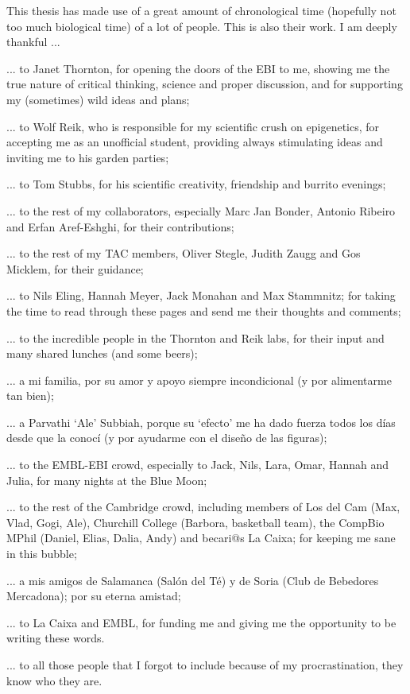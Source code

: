 
\begin{acknowledgements}      


This thesis has made use of a great amount of chronological time (hopefully not too much biological time) of a lot of people. This is also their work. I am deeply thankful ...

\smallskip

... to Janet Thornton, for opening the doors of the EBI to me, showing me the true nature of critical thinking, science and proper discussion, and for supporting my (sometimes) wild ideas and plans;  

... to Wolf Reik, who is responsible for my scientific crush on epigenetics, for accepting me as an unofficial student, providing always stimulating ideas and inviting me to his garden parties;

... to Tom Stubbs, for his scientific creativity, friendship and burrito evenings;

... to the rest of my collaborators, especially Marc Jan Bonder, Antonio Ribeiro and Erfan Aref-Eshghi, for their contributions;

... to the rest of my TAC members, Oliver Stegle, Judith Zaugg and Gos Micklem, for their guidance;

... to Nils Eling, Hannah Meyer, Jack Monahan and Max Stammnitz; for taking the time to read through these pages and send me their thoughts and comments;

... to the incredible people in the Thornton and Reik labs, for their input and many shared lunches (and some beers);

... a mi familia, por su amor y apoyo siempre incondicional (y por alimentarme tan bien);

... a Parvathi `Ale' Subbiah, porque su `efecto' me ha dado fuerza todos los días desde que la conocí (y por ayudarme con el diseño de las figuras);

... to the EMBL-EBI crowd, especially to Jack, Nils, Lara, Omar, Hannah and Julia, for many nights at the Blue Moon;

... to the rest of the Cambridge crowd, including members of Los del Cam (Max, Vlad, Gogi, Ale), Churchill College (Barbora, basketball team), the CompBio MPhil (Daniel, Elias, Dalia, Andy) and becari@s La Caixa; for keeping me sane in this bubble;

... a mis amigos de Salamanca (Salón del Té) y de Soria (Club de Bebedores Mercadona); por su eterna amistad;

... to La Caixa and EMBL, for funding me and giving me the opportunity to be writing these words.

... to all those people that I forgot to include because of my procrastination, they know who they are. 




\end{acknowledgements}

